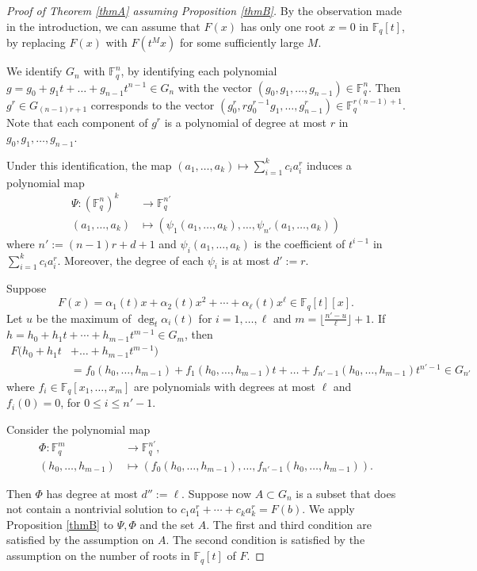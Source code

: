 \documentclass[10pt,a4paper]{amsart}
\newcommand{\F}{\mathbb{F}}
\newcommand\Fq{{\mathbb{F}_q}}
\begin{document}
\begin{proof}[Proof of Theorem \ref{thmA} assuming Proposition \ref{thmB}]
By the observation made in the introduction, we can assume that $F(x)$ has only one root $x=0$ in $\Fq[t]$, by replacing $F(x)$ with $F(t^Mx)$ for some sufficiently large $M$.

We identify $G_n$ with $\F_q^n$, by identifying each polynomial $g=g_0+g_1t+\dots+ g_{n-1}t^{n-1} \in G_n$ with the vector $(g_0,g_1, \dots , g_{n-1})\in \mathbb{F}_q^n$. Then $g^r \in G_{(n-1)r+1}$ corresponds to the vector $(g_0^r, rg_0^{r-1}g_1,\ldots,g_{n-1}^r) \in \mathbb{F}_q^{r(n-1)+1}$. Note that each component of $g^r$ is a polynomial of degree at most $r$ in $g_0,g_1, \dots , g_{n-1}$. 
	
Under this identification, the map 
$
	(a_1,\dots, a_k) \mapsto \sum ^k_{i=1} c_i a_i^r
$
induces a polynomial map 
\begin{align*}
\Psi: (\mathbb{F}_q^n)^k & \rightarrow \mathbb{F}_q^{n'} \\  %
	(a_1,\dots, a_k) & \mapsto (\psi_1 (a_1,\dots, a_k), \ldots, \psi_{n'} (a_1,\dots, a_k) )
\end{align*}	
where $n':=(n-1)r+d+1$ and $\psi_i (a_1,\dots, a_k)$ is the coefficient of $t^{i-1}$ in $\sum ^k_{i=1} c_i a_i^r$. Moreover, the degree of each $\psi_i$ is at most $d':=r$.
	
Suppose 
\[
F(x) = \alpha_1(t) x+ \alpha_2(t) x^2+\cdots +\alpha_{\ell}(t) x^\ell \in \Fq[t][x].
\]
Let $u$ be the maximum of $\deg_t \alpha_{i}(t)$ for $i=1, \ldots, \ell$ and $m = \lfloor {\frac{n'-u}{\ell}}\rfloor +1$. If $h= h_0+h_1t+\cdots+h_{m-1}t^{m-1} \in G_m$, then 
	\begin{align*}
		F(h_0+h_1t&+\dots+h_{m-1}t^{m-1})\\
		&= f_0(h_0,\dots, h_{m-1})+f_1(h_0,\dots, h_{m-1})t+\dots+f_{n'-1}(h_0,\dots, h_{m-1})t^{n'-1} \in G_{n'}
	\end{align*}
	where $f_i \in \Fq[x_1, \dots,x_m]$ are polynomials with degrees at most $\ell$ and $f_i(0)=0$, for $0 \leq i\leq n'-1$.
	
Consider the polynomial map 
\begin{align*}
\Phi:\mathbb{F}_q^m & \rightarrow \mathbb{F}_q^{n'}, \\
(h_0, \ldots, h_{m-1}) &\mapsto (f_0(h_0,\dots, h_{m-1}), \ldots, f_{n'-1}(h_0,\dots, h_{m-1})). 
\end{align*}
	
Then $\Phi$ has degree at most $d'':=\ell$.  Suppose now $A \subset G_n$ is a subset that does not contain a nontrivial solution to $c_1 a_1 ^r + \cdots + c_k a_k^r = F(b)$.
We apply Proposition \ref{thmB} to $\Psi, \Phi$ and the set $A$. The first and third condition are satisfied by the assumption on $A$. The second condition is satisfied by the assumption on the number of roots in $\Fq[t]$ of $F$. 


\end{proof}
\end{document}
